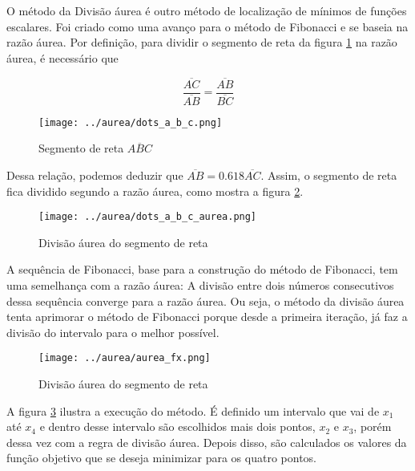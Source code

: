O método da Divisão áurea é outro método de localização de mínimos de funções escalares. Foi criado como uma avanço para o método de Fibonacci e se baseia na razão áurea. Por definição, para dividir o segmento de reta da figura \ref{fig:abc} na razão áurea, é necessário que

\begin{equation}
	\dfrac{\overline{AC}}{\overline{AB}} = \dfrac{\overline{AB}}{\overline{BC}}
\end{equation}

\begin{figure}[h]
	\begin{center}
		\texttt{[image: ../aurea/dots\_a\_b\_c.png]}   
		\caption{Segmento de reta $ \overline{ABC} $}
		\label{fig:abc}
	\end{center}
\end{figure}

Dessa relação, podemos deduzir que $ \overline{AB} = 0.618\overline{AC} $. Assim, o segmento de reta fica dividido segundo a razão áurea, como mostra a figura \ref{fig:aurea_abc}.

\begin{figure}[h]
	\begin{center}
		\texttt{[image: ../aurea/dots\_a\_b\_c\_aurea.png]}   
		\caption{Divisão áurea do segmento de reta}
		\label{fig:aurea_abc}
	\end{center}
\end{figure}

A sequência de Fibonacci, base para a construção do método de Fibonacci, tem uma semelhança com a razão áurea: A divisão entre dois números consecutivos dessa sequência converge para a razão áurea. Ou seja, o método da divisão áurea tenta aprimorar o método de Fibonacci porque desde a primeira iteração, já faz a divisão do intervalo para o melhor possível.

\begin{figure}[h]
	\begin{center}
		\texttt{[image: ../aurea/aurea\_fx.png]}   
		\caption{Divisão áurea do segmento de reta}
		\label{fig:aurea_fx}
	\end{center}
\end{figure}

A figura \ref{fig:aurea_fx} ilustra a execução do método. É definido um intervalo que vai de $ x_1 $ até $ x_4 $ e dentro desse intervalo são escolhidos mais dois pontos, $ x_2 $ e $ x_3 $, porém dessa vez com a regra de divisão áurea. Depois disso, são calculados os valores da função objetivo que se deseja minimizar para os quatro pontos.

